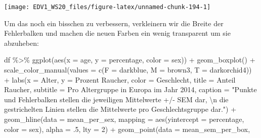 \documentclass[
]{book}
\newenvironment{Shaded}{\begin{snugshade}}{\end{snugshade}}
\newcommand{\AttributeTok}[1]{\textcolor[rgb]{0.77,0.63,0.00}{#1}}
\newcommand{\DecValTok}[1]{\textcolor[rgb]{0.00,0.00,0.81}{#1}}
\newcommand{\FunctionTok}[1]{\textcolor[rgb]{0.00,0.00,0.00}{#1}}
\newcommand{\NormalTok}[1]{#1}
\newcommand{\SpecialCharTok}[1]{\textcolor[rgb]{0.00,0.00,0.00}{#1}}
\newcommand{\StringTok}[1]{\textcolor[rgb]{0.31,0.60,0.02}{#1}}
\begin{document}
\begin{center}\texttt{[image: EDV1\_WS20\_files/figure-latex/unnamed-chunk-194-1]} \end{center}

Um das noch ein bisschen zu verbessern, verkleinern wir die Breite der Fehlerbalken und machen die neuen Farben ein wenig transparent um sie abzuheben:

\begin{Shaded}
\begin{Highlighting}[]
\NormalTok{df }\SpecialCharTok{\%\textgreater{}\%} 
  \FunctionTok{ggplot}\NormalTok{(}\FunctionTok{aes}\NormalTok{(}\AttributeTok{x =}\NormalTok{ age,}
             \AttributeTok{y =}\NormalTok{ percentage,}
             \AttributeTok{color =}\NormalTok{ sex)) }\SpecialCharTok{+}
  \FunctionTok{geom\_boxplot}\NormalTok{() }\SpecialCharTok{+}
  \FunctionTok{scale\_color\_manual}\NormalTok{(}\AttributeTok{values =} \FunctionTok{c}\NormalTok{(}\AttributeTok{F =} \StringTok{\textquotesingle{}darkblue\textquotesingle{}}\NormalTok{,}
                               \AttributeTok{M =} \StringTok{\textquotesingle{}brown3\textquotesingle{}}\NormalTok{,}
                               \AttributeTok{T =} \StringTok{\textquotesingle{}darkorchid4\textquotesingle{}}\NormalTok{)) }\SpecialCharTok{+}
  \FunctionTok{labs}\NormalTok{(}\AttributeTok{x =} \StringTok{\textquotesingle{}Alter\textquotesingle{}}\NormalTok{,}
       \AttributeTok{y =} \StringTok{\textquotesingle{}Prozent Raucher\textquotesingle{}}\NormalTok{,}
       \AttributeTok{color =} \StringTok{\textquotesingle{}Geschlecht\textquotesingle{}}\NormalTok{,}
       \AttributeTok{title =} \StringTok{\textquotesingle{}Anteil Raucher\textquotesingle{}}\NormalTok{,}
       \AttributeTok{subtitle =} \StringTok{\textquotesingle{}Pro Altergruppe in Europa im Jahr 2014\textquotesingle{}}\NormalTok{,}
       \AttributeTok{caption =} \StringTok{"Punkte und Fehlerbalken stellen die jeweiligen Mittelwerte +/{-} SEM dar, }\SpecialCharTok{\textbackslash{}n}\StringTok{ die gestrichelten Linien stellen die Mittelwerte pro Geschlechtsgruppe dar."}\NormalTok{) }\SpecialCharTok{+}
  \FunctionTok{geom\_hline}\NormalTok{(}\AttributeTok{data =}\NormalTok{ mean\_per\_sex,}
             \AttributeTok{mapping =} \FunctionTok{aes}\NormalTok{(}\AttributeTok{yintercept =}\NormalTok{ percentage,}
                           \AttributeTok{color =}\NormalTok{ sex),}
             \AttributeTok{alpha =}\NormalTok{ .}\DecValTok{5}\NormalTok{,}
             \AttributeTok{lty =} \DecValTok{2}\NormalTok{) }\SpecialCharTok{+}
  \FunctionTok{geom\_point}\NormalTok{(}\AttributeTok{data =}\NormalTok{ mean\_sem\_per\_box,}

\end{Highlighting}
\end{Shaded}
\end{document}

